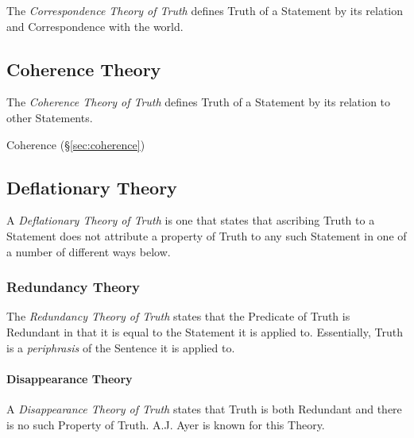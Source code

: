 The \emph{Correspondence Theory of Truth} defines Truth of a Statement
by its relation and Correspondence with the world.



\subsection{Coherence Theory}\label{sec:coherence_theory}

The \emph{Coherence Theory of Truth} defines Truth of a Statement by
its relation to other Statements.

\fist Coherence (\S\ref{sec:coherence})



\subsection{Deflationary Theory}\label{sec:deflationary_truth}

A \emph{Deflationary Theory of Truth} is one that states that
ascribing Truth to a Statement does not attribute a property of Truth
to any such Statement in one of a number of different ways below.



\subsubsection{Redundancy Theory}\label{sec:redundancy_theory}

The \emph{Redundancy Theory of Truth} states that the Predicate of
Truth is Redundant in that it is equal to the Statement it is applied
to.\cite{ramsey27} Essentially, Truth is a \emph{periphrasis} of the
Sentence it is applied to.



\paragraph{Disappearance Theory}\label{sec:disappearance_theory}\hfill

A \emph{Disappearance Theory of Truth} states that Truth is both
Redundant and there is no such Property of Truth. A.J. Ayer is known
for this Theory.



